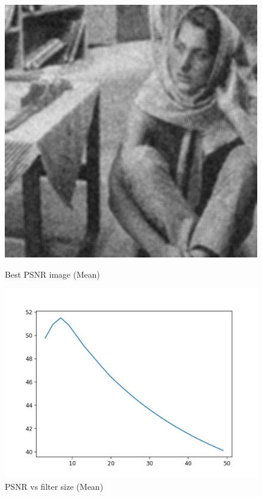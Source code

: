 \documentclass{article}
\begin{document}
    \begin{figure}[!htb]
      \includegraphics[scale=0.3]{./basic_denoising/barbara/average_best_gaussian.png}
      \caption{Best PSNR image (Mean)}
    \endminipage \hfill
      \includegraphics[scale=.45]{./basic_denoising/barbara/average_psnr_gaussian.png}
      \caption{PSNR vs filter size (Mean)}
    \endminipage
    \end{figure}
    
\end{document}
